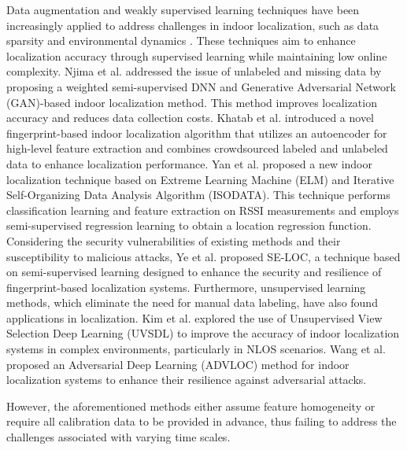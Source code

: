 Data augmentation and weakly supervised learning techniques have been increasingly applied to address challenges in indoor localization, such as data sparsity and environmental dynamics \cite{njima2022dnn,khatab2021fingerprint,yan2020elm,ye2022se,kim2021unsupervised,wang2022adversarial}. These techniques aim to enhance localization accuracy through supervised learning while maintaining low online complexity.  Njima et al. \cite{njima2022dnn} addressed the issue of unlabeled and missing data by proposing a weighted semi-supervised DNN and Generative Adversarial Network (GAN)-based indoor localization method. This method improves localization accuracy and reduces data collection costs. Khatab et al. \cite{khatab2021fingerprint} introduced a novel fingerprint-based indoor localization algorithm that utilizes an autoencoder for high-level feature extraction and combines crowdsourced labeled and unlabeled data to enhance localization performance. Yan et al. \cite{yan2020elm} proposed a new indoor localization technique based on Extreme Learning Machine (ELM) and Iterative Self-Organizing Data Analysis Algorithm (ISODATA). This technique performs classification learning and feature extraction on RSSI measurements and employs semi-supervised regression learning to obtain a location regression function. Considering the security vulnerabilities of existing methods and their susceptibility to malicious attacks, Ye et al. \cite{ye2022se} proposed SE-LOC, a technique based on semi-supervised learning designed to enhance the security and resilience of fingerprint-based localization systems.  Furthermore, unsupervised learning methods, which eliminate the need for manual data labeling, have also found applications in localization. Kim et al. \cite{kim2021unsupervised} explored the use of Unsupervised View Selection Deep Learning (UVSDL) to improve the accuracy of indoor localization systems in complex environments, particularly in NLOS scenarios. Wang et al. \cite{wang2022adversarial} proposed an Adversarial Deep Learning (ADVLOC) method for indoor localization systems to enhance their resilience against adversarial attacks.

However, the aforementioned methods either assume feature homogeneity or require all calibration data to be provided in advance, thus failing to address the challenges associated with varying time scales.

